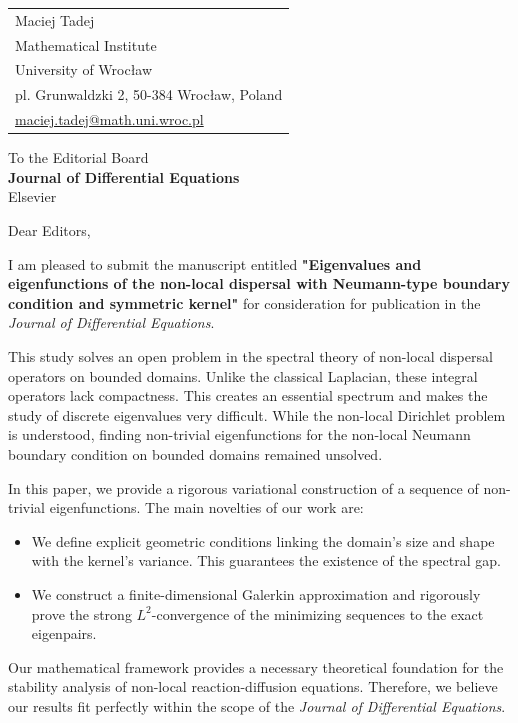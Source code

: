 \documentclass[11pt, a4paper]{article}
\begin{document}
\noindent
\begin{tabular}{@{}l}
Maciej Tadej \\
Mathematical Institute \\
University of Wrocław \\
pl. Grunwaldzki 2, 50-384 Wrocław, Poland \\
\href{mailto:maciej.tadej@math.uni.wroc.pl}{maciej.tadej@math.uni.wroc.pl}
\end{tabular}

\vspace{2em}

\noindent
To the Editorial Board \\
\textbf{Journal of Differential Equations} \\
Elsevier

\vspace{2em}

\noindent
Dear Editors,

\vspace{1em}

\noindent
I am pleased to submit the manuscript entitled \textbf{"Eigenvalues and eigenfunctions of the non-local dispersal with Neumann-type boundary condition and symmetric kernel"} for consideration for publication in the \textit{Journal of Differential Equations}.

This study solves an open problem in the spectral theory of non-local dispersal operators on bounded domains. Unlike the classical Laplacian, these integral operators lack compactness. This creates an essential spectrum and makes the study of discrete eigenvalues very difficult. While the non-local Dirichlet problem is understood, finding non-trivial eigenfunctions for the non-local Neumann boundary condition on bounded domains remained unsolved.

In this paper, we provide a rigorous variational construction of a sequence of non-trivial eigenfunctions. The main novelties of our work are:
\begin{itemize}
    \item We define explicit geometric conditions linking the domain's size and shape with the kernel's variance. This guarantees the existence of the spectral gap.
    \item We construct a finite-dimensional Galerkin approximation and rigorously prove the strong $L^2$-convergence of the minimizing sequences to the exact eigenpairs.
\end{itemize}

Our mathematical framework provides a necessary theoretical foundation for the stability analysis of non-local reaction-diffusion equations. Therefore, we believe our results fit perfectly within the scope of the \textit{Journal of Differential Equations}.
\end{document}
